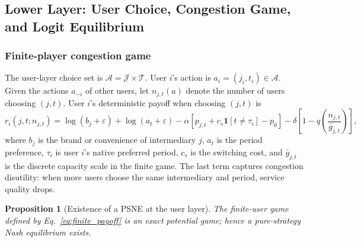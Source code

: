 \documentclass[11pt,a4paper]{article}
\newtheorem{proposition}{Proposition}
\newcommand{\qos}{q}
\newcommand{\T}{\mathcal{T}}
\newcommand{\J}{\mathcal{J}}
\newcommand{\A}{\mathcal{A}}
\begin{document}
\subsection{Lower Layer: User Choice, Congestion Game, and Logit Equilibrium}
\label{sec:lower_user}

\subsubsection{Finite-player congestion game}

The user-layer choice set is $\A=\J\times\T$. User $i$'s action is $a_i=(j_i,t_i)\in\A$. Given the actions $a_{-i}$ of other users, let $n_{j,t}(a)$ denote the number of users choosing $(j,t)$. User $i$'s deterministic payoff when choosing $(j,t)$ is
\begin{equation}
  r_i(j,t;n_{j,t}) =
  \log(b_j+\varepsilon)+\log(a_t+\varepsilon)
  -\alpha\left[p_{j,t}+c_s\mathbf{1}[t\ne \tau_i]-p_0\right]
  -\delta\left[1-\qos\!\left(\frac{n_{j,t}}{\bar g_{j,t}}\right)\right],
  \label{eq:finite_payoff}
\end{equation}
where $b_j$ is the brand or convenience of intermediary $j$, $a_t$ is the period preference, $\tau_i$ is user $i$'s native preferred period, $c_s$ is the switching cost, and $\bar g_{j,t}$ is the discrete capacity scale in the finite game. The last term captures congestion disutility: when more users choose the same intermediary and period, service quality drops.

\begin{proposition}[Existence of a PSNE at the user layer]
\label{prop:psne}
The finite-user game defined by Eq.~\eqref{eq:finite_payoff} is an exact potential game; hence a pure-strategy Nash equilibrium exists.
\end{proposition}
\end{document}
